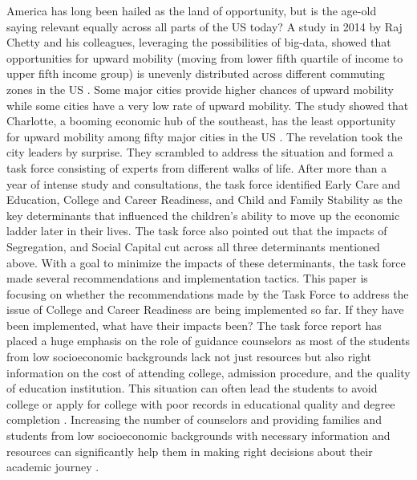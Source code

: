 America has long been hailed as the land of opportunity, but is the age-old saying relevant equally across all parts of the US today?  
A study in 2014 by Raj Chetty and his colleagues, leveraging the possibilities of big-data, showed that opportunities for upward mobility (moving from lower fifth quartile of income to upper fifth income group) is unevenly distributed across different commuting zones in the US \parencite[][p. 1]{chetty2014}. 
Some major cities provide higher chances of upward mobility while some cities have a very low rate of upward mobility. The study showed that Charlotte, a booming economic hub of the southeast, has the least opportunity for upward mobility among fifty major cities in the US \parencite[][p. 1]{chetty2014}. 
The revelation took the city leaders by surprise. They scrambled to address the situation and  formed a task force consisting of experts from different walks of life. 
After more than a year of intense study and consultations, the task force  identified Early Care and Education, College and Career Readiness, and Child and Family Stability as the key determinants that influenced the children's ability to move up the economic ladder later in their lives. 
The task force also pointed out that the impacts of Segregation, and Social Capital cut across all three determinants mentioned above. 
With a goal to minimize the impacts of these determinants, the task force made several recommendations and implementation tactics. This paper is focusing on  whether the recommendations made by the Task Force to address the issue of College and Career Readiness are being implemented so far. 
If they have been implemented, what have their impacts been?
The task force report has placed a huge emphasis on the role of guidance counselors as most of the students from low socioeconomic backgrounds lack not just resources but also right information on the cost of attending college, admission procedure, and the quality of education institution. 
This situation can often lead the students to avoid college or apply for college with poor records in educational quality and degree completion \parencite[][]{castleman2014intensive}.
Increasing the number of counselors and providing families and students from low socioeconomic backgrounds with necessary information and resources can significantly help them in making right decisions about their academic journey \parencite[][]{castleman2014intensive}.
